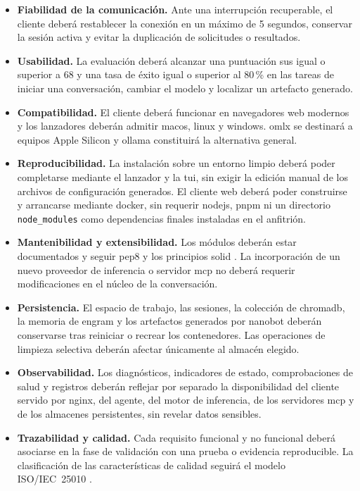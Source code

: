 \begin{itemize}
    \item[\textbf{RNF7.}] \textbf{Fiabilidad de la comunicación.} Ante una interrupción recuperable, el cliente deberá restablecer la conexión en un máximo de 5 segundos, conservar la sesión activa y evitar la duplicación de solicitudes o resultados.
    \item[\textbf{RNF8.}] \textbf{Usabilidad.} La evaluación deberá alcanzar una puntuación \gls{sus} igual o superior a 68 y una tasa de éxito igual o superior al 80\,\% en las tareas de iniciar una conversación, cambiar el modelo y localizar un artefacto generado.
    \item[\textbf{RNF9.}] \textbf{Compatibilidad.} El cliente deberá funcionar en navegadores web modernos y los lanzadores deberán admitir \gls{macos}, \gls{linux} y \gls{windows}. \gls{omlx} se destinará a equipos Apple Silicon y \gls{ollama} constituirá la alternativa general.
    \item[\textbf{RNF10.}] \textbf{Reproducibilidad.} La instalación sobre un entorno limpio deberá poder completarse mediante el lanzador y la \gls{tui}, sin exigir la edición manual de los archivos de configuración generados. El cliente web deberá poder construirse y arrancarse mediante \gls{docker}, sin requerir \gls{nodejs}, \gls{pnpm} ni un directorio \texttt{node\_modules} como dependencias finales instaladas en el anfitrión.
    \item[\textbf{RNF11.}] \textbf{Mantenibilidad y extensibilidad.} Los módulos deberán estar documentados y seguir \gls{pep8} y los principios \gls{solid} \cite{PEP8Style,SOLIDPrinciplesCinco2025}. La incorporación de un nuevo proveedor de inferencia o servidor \gls{mcp} no deberá requerir modificaciones en el núcleo de la conversación.
    \item[\textbf{RNF12.}] \textbf{Persistencia.} El espacio de trabajo, las sesiones, la colección de \gls{chromadb}, la memoria de \gls{engram} y los artefactos generados por \gls{nanobot} deberán conservarse tras reiniciar o recrear los contenedores. Las operaciones de limpieza selectiva deberán afectar únicamente al almacén elegido.
    \item[\textbf{RNF13.}] \textbf{Observabilidad.} Los diagnósticos, indicadores de estado, comprobaciones de salud y registros deberán reflejar por separado la disponibilidad del cliente servido por \gls{nginx}, del agente, del motor de inferencia, de los servidores \gls{mcp} y de los almacenes persistentes, sin revelar datos sensibles.
    \item[\textbf{RNF14.}] \textbf{Trazabilidad y calidad.} Cada requisito funcional y no funcional deberá asociarse en la fase de validación con una prueba o evidencia reproducible. La clasificación de las características de calidad seguirá el modelo ISO/IEC~25010 \cite{ISOIEC25010}.
\end{itemize}

